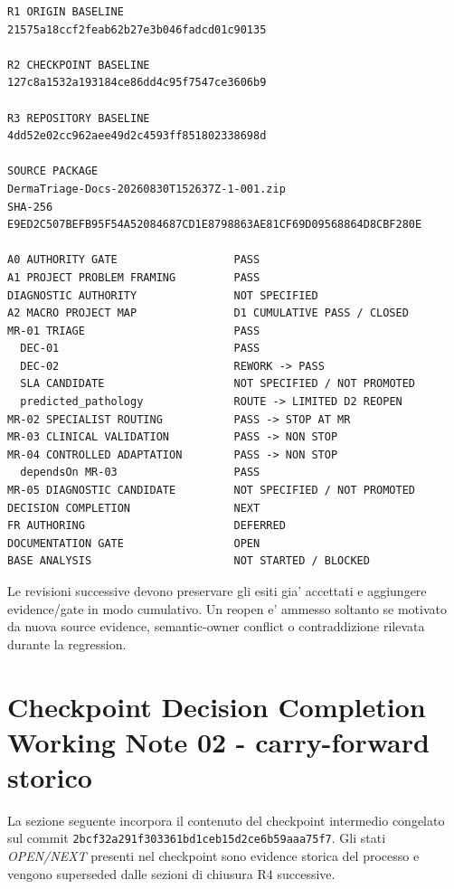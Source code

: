 \documentclass[11pt,a4paper]{article}
\begin{document}
\begin{lstlisting}
R1 ORIGIN BASELINE
21575a18ccf2feab62b27e3b046fadcd01c90135

R2 CHECKPOINT BASELINE
127c8a1532a193184ce86dd4c95f7547ce3606b9

R3 REPOSITORY BASELINE
4dd52e02cc962aee49d2c4593ff851802338698d

SOURCE PACKAGE
DermaTriage-Docs-20260830T152637Z-1-001.zip
SHA-256
E9ED2C507BEFB95F54A52084687CD1E8798863AE81CF69D09568864D8CBF280E

A0 AUTHORITY GATE                  PASS
A1 PROJECT PROBLEM FRAMING         PASS
DIAGNOSTIC AUTHORITY               NOT SPECIFIED
A2 MACRO PROJECT MAP               D1 CUMULATIVE PASS / CLOSED
MR-01 TRIAGE                       PASS
  DEC-01                           PASS
  DEC-02                           REWORK -> PASS
  SLA CANDIDATE                    NOT SPECIFIED / NOT PROMOTED
  predicted_pathology              ROUTE -> LIMITED D2 REOPEN
MR-02 SPECIALIST ROUTING           PASS -> STOP AT MR
MR-03 CLINICAL VALIDATION          PASS -> NON STOP
MR-04 CONTROLLED ADAPTATION        PASS -> NON STOP
  dependsOn MR-03                  PASS
MR-05 DIAGNOSTIC CANDIDATE         NOT SPECIFIED / NOT PROMOTED
DECISION COMPLETION                NEXT
FR AUTHORING                       DEFERRED
DOCUMENTATION GATE                 OPEN
BASE ANALYSIS                      NOT STARTED / BLOCKED
\end{lstlisting}

\begin{ddtacore}[title={Continuation invariant}]
Le revisioni successive devono preservare gli esiti gia' accettati e aggiungere evidence/gate in modo cumulativo. Un reopen e' ammesso soltanto se motivato da nuova source evidence, semantic-owner conflict o contraddizione rilevata durante la regression.
\end{ddtacore}

\clearpage
\section{Checkpoint Decision Completion Working Note 02 - carry-forward storico}
\begin{ddtaprinciple}[title={Ruolo del carry-forward}]
La sezione seguente incorpora il contenuto del checkpoint intermedio congelato sul commit
\texttt{2bcf32a291f303361bd1ceb15d2ce6b59aaa75f7}. Gli stati \emph{OPEN/NEXT} presenti nel checkpoint
sono evidence storica del processo e vengono superseded dalle sezioni di chiusura R4 successive.
\end{ddtaprinciple}
\end{document}
